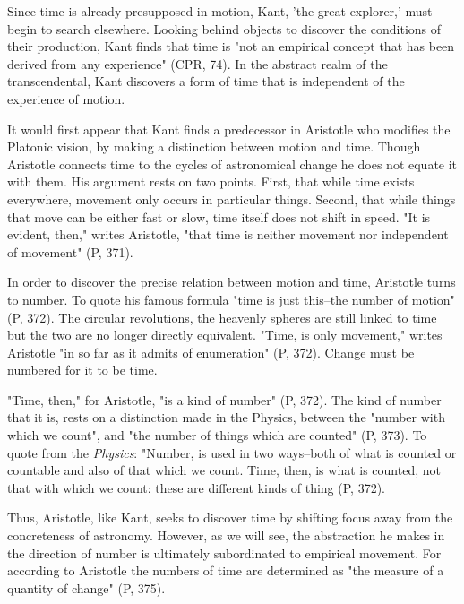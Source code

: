 Since time is already presupposed in motion, Kant, 'the great explorer,' must begin to search elsewhere. Looking behind objects to discover the conditions of their production, Kant finds that time is "not an empirical concept that has been derived from any experience" (CPR, 74). In the abstract realm of the transcendental, Kant discovers a form of time that is independent of the experience of motion.

It would first appear that Kant finds a predecessor in Aristotle who modifies the Platonic vision, by making a distinction between motion and time. Though Aristotle connects time to the cycles of astronomical change he does not equate it with them. His argument rests on two points. First, that while time exists everywhere, movement only occurs in particular things. Second, that while things that move can be either fast or slow, time itself does not shift in speed. "It is evident, then," writes Aristotle, "that time is neither movement nor independent of movement" (P, 371).

In order to discover the precise relation between motion and time, Aristotle turns to number. To quote his famous formula "time is just this--the
number of motion" (P, 372). The circular revolutions, the heavenly spheres are still linked to time but the two are no longer directly equivalent. "Time, is only movement," writes Aristotle "in so far as it admits of enumeration" (P, 372). Change must be numbered for it to be time. 

"Time, then," for Aristotle, "is a kind of number" (P, 372). The kind of number that it is, rests on a distinction made in the Physics, between the "number with which we count", and "the number of things which are counted" (P, 373). To quote from the \textit{Physics}: "Number, is used in two ways--both of what is counted or countable and also of that which we count. Time, then, is what is counted, not that with which we count: these are different kinds of thing (P, 372).

Thus, Aristotle, like Kant, seeks to discover time by shifting focus away from the concreteness of astronomy. However, as we will see, the abstraction he makes in the direction of number is ultimately subordinated to empirical movement. For according to Aristotle the numbers of time are determined as "the measure of a quantity of change" (P, 375).

